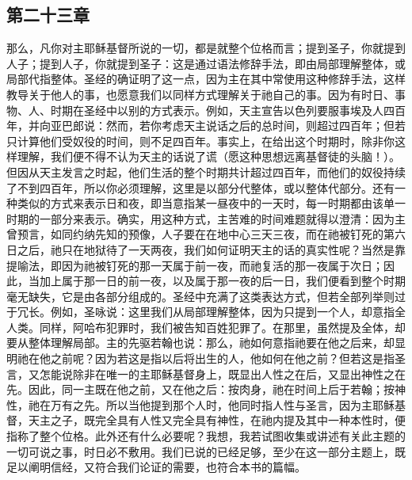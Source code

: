 \subsection{第二十三章}

\par

那么，凡你对主耶稣基督所说的一切，都是就整个位格而言；提到圣子，你就提到人子；提到人子，你就提到圣子：这是通过语法修辞手法，即由局部理解整体，或局部代指整体。\newline{}圣经的确证明了这一点，因为主在其中常使用这种修辞手法，这样教导关于他人的事，也愿意我们以同样方式理解关于祂自己的事。因为有时日、事物、人、时期在圣经中以别的方式表示。例如，天主宣告以色列要服事埃及人四百年，并向亚巴郎说：\newline{}然而，若你考虑天主说话之后的总时间，则超过四百年；但若只计算他们受奴役的时间，则不足四百年。事实上，在给出这个时期时，除非你这样理解，我们便不得不认为天主的话说了谎（愿这种思想远离基督徒的头脑！）。但因从天主发言之时起，他们生活的整个时期共计超过四百年，而他们的奴役持续了不到四百年，所以你必须理解，这里是以部分代整体，或以整体代部分。还有一种类似的方式来表示日和夜，即当意指某一昼夜中的一天时，每一时期都由该单一时期的一部分来表示。确实，用这种方式，主苦难的时间难题就得以澄清：因为主曾预言，如同约纳先知的预像，人子要在在地中心三天三夜，\newline{}而在祂被钉死的第六日之后，祂只在地狱待了一天两夜，我们如何证明天主的话的真实性呢？当然是靠提喻法，即因为祂被钉死的那一天属于前一夜，而祂复活的那一夜属于次日；因此，当加上属于那一日的前一夜，以及属于那一夜的后一日，我们便看到整个时期毫无缺失，它是由各部分组成的。圣经中充满了这类表达方式，但若全部列举则过于冗长。例如，圣咏说：这里我们从局部理解整体，因为只提到一个人，却意指全人类。同样，阿哈布犯罪时，我们被告知百姓犯罪了。在那里，虽然提及全体，却要从整体理解局部。主的先驱若翰也说：\newline{}那么，祂如何意指祂要在他之后来，却显明祂在他之前呢？因为若这是指以后将出生的人，他如何在他之前？但若这是指圣言，又怎能说除非在唯一的主耶稣基督身上，既显出人性之在后，又显出神性之在先。因此，同一主既在他之前，又在他之后：按肉身，祂在时间上后于若翰；按神性，祂在万有之先。所以当他提到那个人时，他同时指人性与圣言，因为主耶稣基督，天主之子，既完全具有人性又完全具有神性，在祂内提及其中一种本性时，便指称了整个位格。此外还有什么必要呢？我想，我若试图收集或讲述有关此主题的一切可说之事，时日必不敷用。我们已说的已经足够，至少在这一部分主题上，既足以阐明信经，又符合我们论证的需要，也符合本书的篇幅。\par

